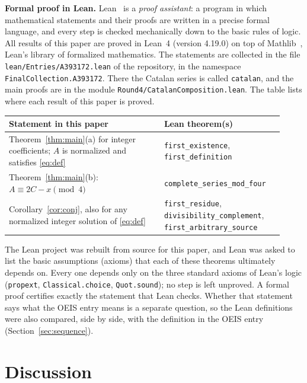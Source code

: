 \documentclass[11pt,a4paper]{article}
\theoremstyle{definition}
\theoremstyle{remark}
\newcommand{\para}[1]{\par\medskip\noindent\textbf{#1}\enspace}
\begin{document}
\para{Formal proof in Lean.}
Lean~\cite{lean} is a \emph{proof assistant}: a program in which mathematical statements and their proofs are written
in a precise formal language, and every step is checked mechanically down to the basic rules of logic. All results of
this paper are proved in Lean~4 (version 4.19.0) on top of Mathlib~\cite{mathlib}, Lean's library of formalized
mathematics. The statements are collected in the file \texttt{lean/Entries/A393172.lean} of the repository,
in the namespace \texttt{FinalCollection.A393172}. There the Catalan series is called \texttt{catalan}, and the main proofs are in the module \texttt{Round4/CatalanComposition.lean}.
The table lists where each result of this paper is proved.
\begin{center}\small\renewcommand{\arraystretch}{1.25}
\begin{tabular}{>{\raggedright\arraybackslash}p{0.52\linewidth}>{\raggedright\arraybackslash}p{0.4\linewidth}}
\toprule
Statement in this paper & Lean theorem(s)\\
\midrule
Theorem~\ref{thm:main}(a) for integer coefficients; $A$ is normalized and satisfies \eqref{eq:def} & \texttt{first\_\allowbreak{}existence}, \texttt{first\_\allowbreak{}definition} \\
Theorem~\ref{thm:main}(b): $A\equiv2C-x\pmod4$ & \texttt{complete\_\allowbreak{}series\_\allowbreak{}mod\_\allowbreak{}four} \\
Corollary~\ref{cor:conj}, also for any normalized integer solution of \eqref{eq:def} & \texttt{first\_\allowbreak{}residue}, \texttt{divisibility\_\allowbreak{}complement}, \texttt{first\_\allowbreak{}arbitrary\_\allowbreak{}source} \\
\bottomrule
\end{tabular}
\end{center}
The Lean project was rebuilt from source for this paper, and Lean was asked to list the basic assumptions (axioms)
that each of these theorems ultimately depends on. Every one depends only on the three standard axioms of Lean's logic
(\texttt{propext}, \texttt{Classical.choice}, \texttt{Quot.sound}); no step is left unproved. A formal proof certifies
exactly the statement that Lean checks. Whether that statement says what the OEIS entry means is a separate question,
so the Lean definitions were also compared, side by side, with the definition in the OEIS entry
(Section~\ref{sec:sequence}).

\section{Discussion}\label{sec:discussion}
\end{document}

